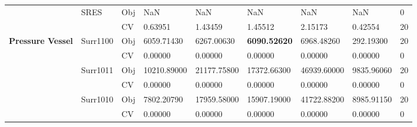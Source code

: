 \begin{table*}[!htb]
\begin{tabular}{lllllllll}
		& SRES                               & Obj                                & NaN                                & NaN                                & NaN                                  & NaN                                 & NaN                               & 0                \\
		&                                    & CV                                 & 0.63951                            & 1.43459                            & 1.45512                              & 2.15173                             & 0.42554                           & 20               \\ \hline
		\multirow{16}{*}{\textbf{Pressure Vessel}}   & Surr1100                           & Obj                                & 6059.71430                         & 6267.00630                         & \textbf{6090.52620}                  & 6968.48260                          & 292.19300                         & 20               \\
		&                                    & CV                                 & 0.00000                            & 0.00000                            & 0.00000                              & 0.00000                             & 0.00000                           & 0                \\
		& Surr1011                           & Obj                                & 10210.89000                        & 21177.75800                        & 17372.66300                          & 46939.60000                         & 9835.96060                        & 20               \\
		&                                    & CV                                 & 0.00000                            & 0.00000                            & 0.00000                              & 0.00000                             & 0.00000                           & 0                \\
		& Surr1010                           & Obj                                & 7802.20790                         & 17959.58000                        & 15907.19000                          & 41722.88200                         & 8985.91150                        & 20               \\
		&                                    & CV                                 & 0.00000                            & 0.00000                            & 0.00000                              & 0.00000                             & 0.00000                           & 0                \\

\end{tabular}
\end{table*}
